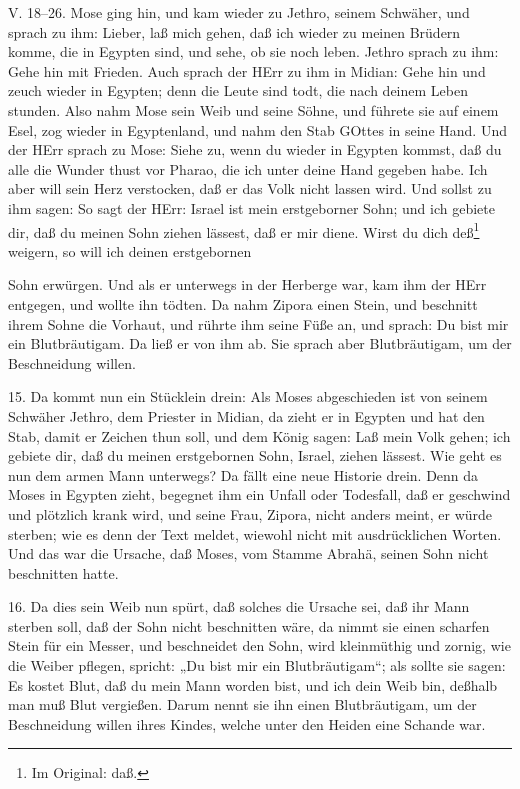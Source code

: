 \begin{schriftzitat}
V. 18–26. Mose ging hin, und kam wieder zu Jethro, seinem Schwäher, und sprach zu ihm: Lieber, laß mich gehen, daß ich wieder zu meinen Brüdern komme, die in Egypten sind, und sehe, ob sie noch leben. Jethro sprach zu ihm: Gehe hin mit Frieden. Auch sprach der HErr zu ihm in Midian: Gehe hin und zeuch wieder in Egypten; denn die Leute sind todt, die nach deinem Leben stunden. Also nahm Mose sein Weib und seine Söhne, und führete sie auf einem Esel, zog wieder in Egyptenland, und nahm den Stab GOttes in seine Hand. Und der HErr sprach zu Mose: Siehe zu, wenn du wieder in Egypten kommst, daß du alle die Wunder thust vor Pharao, die ich unter deine Hand gegeben habe. Ich aber will sein Herz verstocken, daß er das Volk nicht lassen wird. Und sollst zu ihm sagen: So sagt der HErr: Israel ist mein erstgeborner Sohn; und ich gebiete dir, daß du meinen Sohn ziehen lässest, daß er mir diene. Wirst du dich deß\footnote{Im Original: daß.} weigern, so will ich deinen erstgebornen
\end{schriftzitat}

Sohn erwürgen. Und als er unterwegs in der Herberge war, kam ihm der HErr entgegen, und wollte ihn tödten. Da nahm Zipora einen Stein, und beschnitt ihrem Sohne die Vorhaut, und rührte ihm seine Füße an, und sprach: Du bist mir ein Blutbräutigam. Da ließ er von ihm ab. Sie sprach aber Blutbräutigam, um der Beschneidung willen.

15. Da kommt nun ein Stücklein drein: Als Moses abgeschieden ist von seinem Schwäher Jethro, dem Priester in Midian, da zieht er in Egypten und hat den Stab, damit er Zeichen thun soll, und dem König sagen: Laß mein Volk gehen; ich gebiete dir, daß du meinen erstgebornen Sohn, Israel, ziehen lässest. Wie geht es nun dem armen Mann unterwegs? Da fällt eine neue Historie drein. Denn da Moses in Egypten zieht, begegnet ihm ein Unfall oder Todesfall, daß er geschwind und plötzlich krank wird, und seine Frau, Zipora, nicht anders meint, er würde sterben; wie es denn der Text meldet, wiewohl nicht mit ausdrücklichen Worten. Und das war die Ursache, daß Moses, vom Stamme Abrahä, seinen Sohn nicht beschnitten hatte.

16. Da dies sein Weib nun spürt, daß solches die Ursache sei, daß ihr Mann sterben soll, daß der Sohn nicht beschnitten wäre, da nimmt sie einen scharfen Stein für ein Messer, und beschneidet den Sohn, wird kleinmüthig und zornig, wie die Weiber pflegen, spricht: „Du bist mir ein Blutbräutigam“; als sollte sie sagen: Es kostet Blut, daß du mein Mann worden bist, und ich dein Weib bin, deßhalb man muß Blut vergießen. Darum nennt sie ihn einen Blutbräutigam, um der Beschneidung willen ihres Kindes, welche unter den Heiden eine Schande war.

